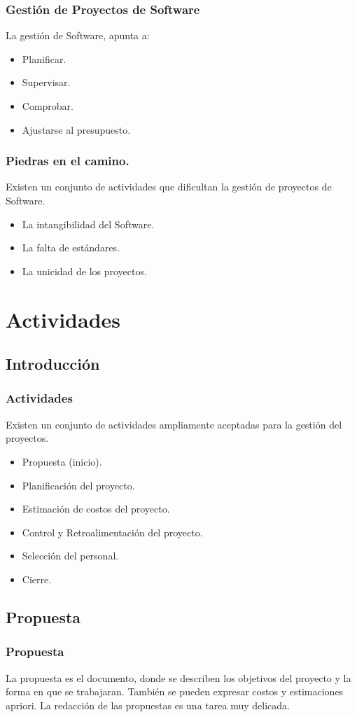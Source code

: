 \documentclass[12pt]{beamer}
\begin{document}
\begin{frame}
 \frametitle{Gestión de Proyectos de Software}
 La gestión de Software, apunta a:
 \begin{itemize}
  \item<2-> Planificar.
  \item<3-> Supervisar.
  \item<4-> Comprobar.
  \item<5-> Ajustarse al presupuesto.
 \end{itemize}
\end{frame}


\begin{frame}
 \frametitle{Piedras en el camino.}
 Existen un conjunto de actividades que dificultan la gestión de proyectos de Software.
 \begin{itemize}
  \item<2-> La intangibilidad del Software.
  \item<3-> La falta de estándares.
  \item<4-> La unicidad de los proyectos.
 \end{itemize}
\end{frame}


\section{Actividades}
\subsection{Introducción}

\begin{frame}
 \frametitle{Actividades}
 Existen un conjunto de actividades ampliamente aceptadas para la gestión del proyectos.
 \begin{itemize}
  \item<2-> Propuesta (inicio).
  \item<3-> Planificación del proyecto.
  \item<4-> Estimación de costos del proyecto.
  \item<5-> Control y Retroalimentación del proyecto.
  \item<6-> Selección del personal.
  \item<7-> Cierre.
 \end{itemize}
\end{frame}


\subsection{Propuesta}
\begin{frame}
 \frametitle{Propuesta}
 La propuesta es el documento, donde se describen los objetivos del proyecto y la forma en que se trabajaran. También se pueden expresar costos y estimaciones apriori.
 \newline
 La redacción de las propuestas es una tarea muy delicada.
\end{frame}
\end{document}
